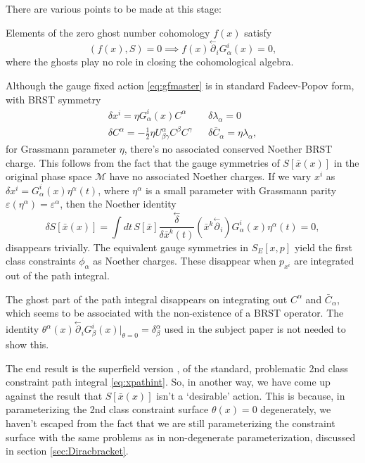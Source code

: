 \documentclass[a4paper,12pt]{article}
\theoremstyle{definition}
\theoremstyle{remark}
\numberwithin{equation}{section}
\newcommand{\al}{\alpha}
\newcommand{\be}{\beta}
\newcommand{\ga}{\gamma}
\newcommand{\de}{\delta}
\newcommand{\la}{\lambda}
\newcommand{\eps}{\varepsilon}
\newcommand{\M}{\mathcal{M}}
\newcommand{\bx}{\bar{x}}
\newcommand{\pl}{\overset{\leftarrow}{\partial}}
\newcommand{\dl}{\overset{\leftarrow}{\delta}}
\begin{document}
There are various points to be made at this stage:

Elements of the zero ghost number cohomology $f(x)$ satisfy
\begin{equation}
(f(x),S)=0 \implies f(x) \pl_i G^i_{\al}(x)=0,
\end{equation}
where the ghosts play no role in closing the cohomological algebra.

Although the gauge fixed action \eqref{eq:gfmaster} is in standard
Fadeev-Popov form, with BRST symmetry
\begin{eqnarray}
\de x^i=\eta G^i_{\al}(x) C^{\al} && \de \la_{\al}=0\\
\de C^{\al}=-\frac{1}{2}\eta U^{\al}_{\be\ga} C^{\be}C^{\ga}  &&
\de\bar{C}_{\al}=\eta \la_{\al},
\end{eqnarray}
for Grassmann parameter $\eta$,  there's no associated conserved
Noether BRST charge. This follows from the fact that the gauge
symmetries of $S[\bx(x)]$ in the original phase space $\M$ have no
associated Noether charges. If we vary $x^i$ as $\de x^i =
G^i_{\al}(x) \eta^{\al}(t)$, where $\eta^{\al}$ is a small
parameter with Grassmann parity $\eps(\eta^{\al})=\eps^{\al}$, then
the Noether identity
\begin{equation}
\de S[\bx(x)]= \int{dt\, S[\bx]\frac{\dl}{\de \bx^k(t)}
(\bx^k\pl_i) G^i_{\al}(x)\eta^{\al}(t)}=0,
\end{equation}
disappears trivially. The equivalent gauge symmetries in $S_E[x,p]$
yield the first class constraints $\phi_{\al}$ as Noether charges.
These disappear when $p_{x^i}$ are integrated out of the path
integral.

The ghost part of the path integral disappears on integrating out
$C^{\al}$ and $\bar{C}_{\al}$, which seems to be associated
with the non-existence of a BRST operator. The identity
$\theta^{\al}(x)\pl_i G^i_{\be}(x)|_{\theta=0}=\de^{\al}_{\be}$
used in the subject paper is not needed to show this.

The end result is the superfield version \cite{Batalin:1998pz}, of
the standard, problematic 2nd class constraint path integral
\eqref{eq:xpathint}. So, in another way, we have come up against
the result that $S[\bx(x)]$ isn't a `desirable' action. This is
because, in parameterizing the 2nd class constraint surface
$\theta(x)=0$ degenerately, we haven't escaped from the fact that
we are still parameterizing the constraint surface with the same
problems as in non-degenerate parameterization, discussed in
section \ref{sec:Diracbracket}.
\end{document}
